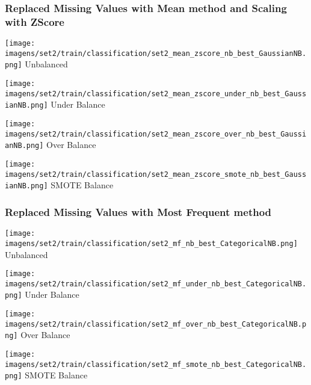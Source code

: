 \documentclass[11pt]{article}
\begin{document}
\subsubsection*{Replaced Missing Values with Mean method and Scaling with ZScore}

\begin{figure*}[!htp]
    \begin{minipage}[!htp]{.25\textwidth}
        \centering
        \texttt{[image: imagens/set2/train/classification/set2\_mean\_zscore\_nb\_best\_GaussianNB.png]}
        Unbalanced
    \end{minipage}\hfill
    \begin{minipage}[!htp]{.25\textwidth}
        \centering
        \texttt{[image: imagens/set2/train/classification/set2\_mean\_zscore\_under\_nb\_best\_GaussianNB.png]}
        Under Balance
    \end{minipage}\hfill
    \begin{minipage}[!htp]{.25\textwidth}
        \centering
        \texttt{[image: imagens/set2/train/classification/set2\_mean\_zscore\_over\_nb\_best\_GaussianNB.png]}
        Over Balance
    \end{minipage}\hfill
    \begin{minipage}[!htp]{.25\textwidth}
        \centering
        \texttt{[image: imagens/set2/train/classification/set2\_mean\_zscore\_smote\_nb\_best\_GaussianNB.png]}
        SMOTE Balance
    \end{minipage}
\end{figure*}

\newpage

\subsubsection*{Replaced Missing Values with Most Frequent method}

\begin{figure*}[!htp]
    \begin{minipage}[!htp]{.25\textwidth}
        \centering
        \texttt{[image: imagens/set2/train/classification/set2\_mf\_nb\_best\_CategoricalNB.png]}
        Unbalanced
    \end{minipage}\hfill
    \begin{minipage}[!htp]{.25\textwidth}
        \centering
        \texttt{[image: imagens/set2/train/classification/set2\_mf\_under\_nb\_best\_CategoricalNB.png]}
        Under Balance
    \end{minipage}\hfill
    \begin{minipage}[!htp]{.25\textwidth}
        \centering
        \texttt{[image: imagens/set2/train/classification/set2\_mf\_over\_nb\_best\_CategoricalNB.png]}
        Over Balance
    \end{minipage}\hfill
    \begin{minipage}[!htp]{.25\textwidth}
        \centering
        \texttt{[image: imagens/set2/train/classification/set2\_mf\_smote\_nb\_best\_CategoricalNB.png]}
        SMOTE Balance
    \end{minipage}
\end{figure*}
\end{document}
